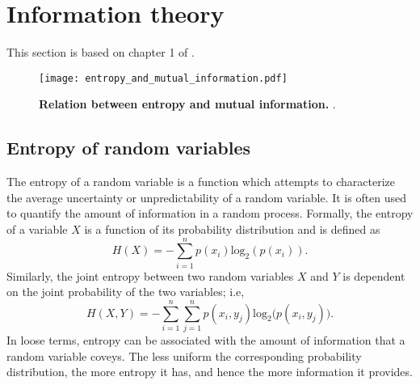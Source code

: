 \section{Information theory}
This section is based on chapter 1 of \cite{Cover1999Elementsinformationtheory}.
\begin{figure*}[!h]
	\centering	
	\hspace*{\fill}
	\texttt{[image: entropy\_and\_mutual\_information.pdf]}
	\hspace*{\fill}	
	\caption[] {\label{fig:entropy_and_mutual_information}\textbf{Relation between entropy and mutual information.} \TODO.}
\end{figure*}
\subsection{Entropy of random variables}
The entropy of a random variable is a function which attempts to characterize
the average uncertainty or unpredictability of a random variable. It is often used to quantify the amount of information in a random process. Formally, the entropy of a variable $X$ is a function of its probability distribution and is defined as 
\begin{equation}\label{eq:entropy}
	H(X) = -\sum_{i=1}^{n}p(x_i)\text{log}_2\left(p\left(x_i\right)\right).
\end{equation}
Similarly, the joint entropy between two random variables $ X $ and $ Y $ is dependent on the joint probability of the two variables; i.e,
\begin{equation}\label{eq:joint_entropy}
	H(X,Y) = -\sum_{i=1}^{n}\sum_{j=1}^{n} p(x_i,y_j)\text{log}_2\big(p\left(x_i,y_j\right)\big).
\end{equation}
In loose terms, entropy can be associated with the amount of information that a random variable coveys. The less uniform the corresponding probability distribution, the more entropy it has, and hence the more information it provides.

